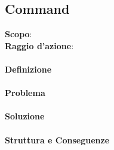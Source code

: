 \subsection{Command}


\textbf{Scopo}:  \\
\textbf{Raggio d'azione}: 

\paragraph{Definizione}

\paragraph{Problema}

\paragraph{Soluzione} 

\paragraph{Struttura e Conseguenze} 

\newpage